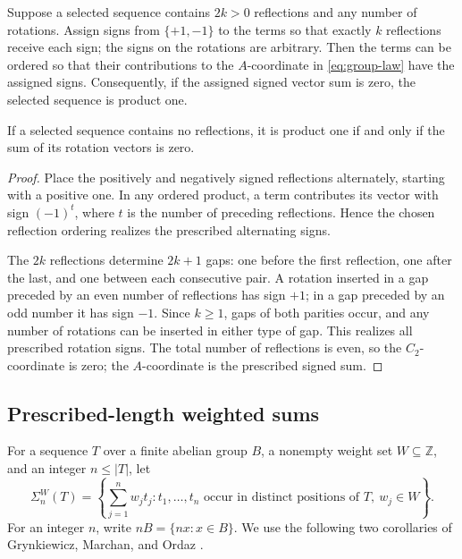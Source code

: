 \begin{lemma}\label{lem:sign-realization}
Suppose a selected sequence contains \(2k>0\) reflections and any
number of rotations. Assign signs from \(\{+1,-1\}\) to the terms so
that exactly \(k\) reflections receive each sign; the signs on the
rotations are arbitrary. Then the terms can be ordered so that their
contributions to the \(A\)-coordinate in \eqref{eq:group-law} have the
assigned signs. Consequently, if the assigned signed vector sum is
zero, the selected sequence is product one.

If a selected sequence contains no reflections, it is product one if
and only if the sum of its rotation vectors is zero.
\end{lemma}

\begin{proof}
Place the positively and negatively signed reflections alternately,
starting with a positive one. In any ordered product, a term contributes
its vector with sign \((-1)^t\), where \(t\) is the number of preceding
reflections. Hence the chosen reflection ordering realizes the prescribed
alternating signs.

The \(2k\) reflections determine \(2k+1\) gaps: one before the first
reflection, one after the last, and one between each consecutive pair.
A rotation inserted in a gap preceded by an even number of reflections
has sign \(+1\); in a gap preceded by an odd number it has sign \(-1\).
Since \(k\ge1\), gaps of both parities occur, and any number of rotations
can be inserted in either type of gap. This realizes all prescribed
rotation signs. The total number of reflections is even, so the
\(C_2\)-coordinate is zero; the \(A\)-coordinate is the prescribed
signed sum.
\end{proof}

\subsection{Prescribed-length weighted sums}

For a sequence \(T\) over a finite abelian group \(B\), a nonempty
weight set \(W\subseteq\mathbb Z\), and an integer \(n\le |T|\), let
\[
  \Sigma_n^W(T)
  =\left\{
      \sum_{j=1}^n w_jt_j:
      t_1,\ldots,t_n\text{ occur in distinct positions of }T,
      \ w_j\in W
    \right\}.
\]
For an integer \(n\), write \(nB=\{nx:x\in B\}\).
We use the following two corollaries of Grynkiewicz, Marchan, and Ordaz
\cite[Corollaries 1.2 and 1.3]{GrynkiewiczMarchanOrdaz2012}.

